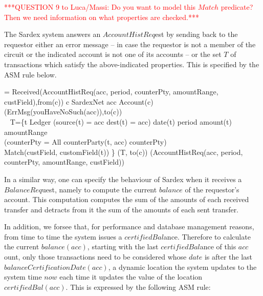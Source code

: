 \vspace{12pt}
\textcolor{red}{***QUESTION 9 to Luca/Massi: Do you want to model this $Match$ predicate? Then we need information on what properties are checked.***}\vspace{12pt}

The Sardex system answers an $AccountHistReq$est by sending back to the requestor 
either an error message -- in case the requestor is not a member of the circuit or 
the indicated account is not one of its accounts -- or the set $T$ of transactions 
which satisfy the above-indicated properties. This is specified by the ASM rule 
below.

\begin{asm}
=\+
   \IF Received(AccountHistReq(acc, period, counterPty, amountRange, custField),from(c))    \THEN \+
     \IF c \not \in SardexNet \OR acc \not\in Account(c) \+
       \THEN {}(ErrMsg(youHaveNoSuch(acc)),to(c))\\
       \ELSE ~ \LET T=\{t \in Ledger \mid (source(t) = acc \OR dest(t) = acc) \+
           \AND date(t) \in period \AND amount(t) \in amountRange \\
           \AND (\IF counterPty \not = All \THEN 
               counterParty(t, acc) \in  counterPty)\\
           \AND Match(custField, customField(t)) \} \IN \+
                 (T, to(c))\dec\dec\-
     (AccountHistReq(acc, period, counterPty, amountRange, custField))
\end{asm}

In a similar way, one can specify the behaviour of Sardex when it receives a $BalanceReq$uest, namely to compute the current $balance$ of the requestor's account. This computation computes the sum of the amounts of each received transfer and detracts from it the sum of the amounts of each sent transfer.

In addition, we forsee that, for performance and database management reasons, from time to time the system issues a $certifiedBal$ance. Therefore to calculate the current $balance(acc)$, starting with the last $certifiedBal$ance of this $acc$ount, only those transactions need to be considered whose $date$ is after the last $balanceCertificationDate(acc)$, a dynamic location the system updates to the system time $now$ each time it updates the value of the location $certifiedBal(acc)$. This is expressed by the following ASM rule:

